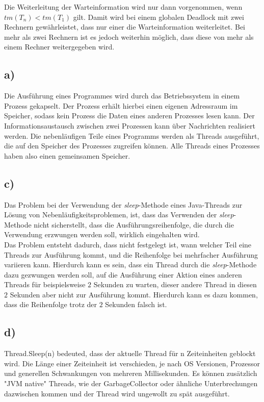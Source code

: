 \documentclass[ngerman]{fbi-aufgabenblatt}
\begin{document}
Die Weiterleitung der Warteinformation wird nur dann vorgenommen, wenn 
$tm (T_{n}) < tm (T_{1})$ gilt. Damit wird bei einem globalen Deadlock mit zwei Rechnern gewährleistet, dass nur einer die Warteinformation weiterleitet. Bei mehr als zwei Rechnern ist es jedoch weiterhin möglich, dass diese von mehr als einem Rechner weitergegeben wird.


\subsection*{a)}
Die Ausführung eines Programmes wird durch das Betriebssystem in einem Prozess gekapselt. Der Prozess erhält hierbei einen eigenen Adressraum im Speicher, sodass kein Prozess die Daten eines anderen Prozesses lesen kann. Der Informationsaustausch zwischen zwei Prozessen kann über Nachrichten realisiert werden. Die nebenläufigen Teile eines Programms werden als Threads ausgeführt, die auf den Speicher des Prozesses zugreifen können. Alle Threads eines Prozesses haben also einen gemeinsamen Speicher.

\subsection*{c)}
Das Problem bei der Verwendung der \textit{sleep}-Methode eines Java-Threads zur Lösung von Nebenläufigkeitsproblemen, ist, dass das Verwenden der \textit{sleep}-Methode nicht sicherstellt, dass die Ausführungsreihenfolge, die durch die Verwendung erzwungen werden soll, wirklich eingehalten wird. \\

Das Problem entsteht dadurch, dass nicht festgelegt ist, wann welcher Teil eine Threads zur Ausführung kommt, und die Reihenfolge bei mehrfacher Ausführung variieren kann. Hierdurch kann es sein, dass ein Thread durch die \textit{sleep}-Methode dazu gezwungen werden soll, auf die Ausführung einer Aktion eines anderen Threads für beispielsweise $2$ Sekunden zu warten, dieser andere Thread in diesen $2$ Sekunden aber nicht zur Ausführung kommt. Hierdurch kann es dazu kommen, dass die Reihenfolge trotz der $2$ Sekunden falsch ist.
\subsection*{d)}
Thread.Sleep(n) bedeuted, dass der aktuelle Thread für n Zeiteinheiten geblockt wird. Die Länge einer Zeiteinheit ist verschieden, je nach OS Versionen, Prozessor und generellen Schwankungen von mehreren Millisekunden. 
Es können zusätzlich "JVM native" Threads, wie der GarbageCollector oder ähnliche Unterbrechungen dazwischen kommen und der Thread wird ungewollt zu spät ausgeführt.
\end{document}
